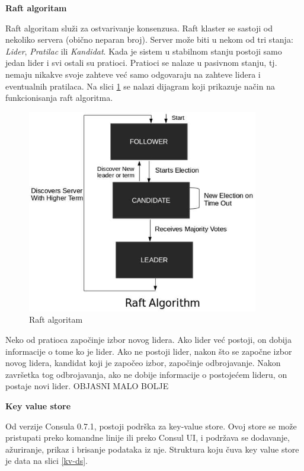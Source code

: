 \documentclass[a4paper,12pt]{report}
\begin{document}
\textbf{Raft algoritam}\newline

Raft algoritam služi za ostvarivanje konsenzusa. Raft klaster se sastoji od  nekoliko servera (obično neparan broj). Server može biti u nekom od tri stanja: \textit{Lider}, \textit{Pratilac} ili \textit{Kandidat}. Kada je sistem u stabilnom stanju postoji samo jedan lider i svi ostali su pratioci. Pratioci se nalaze u pasivnom stanju, tj. nemaju nikakve svoje zahteve već samo odgovaraju na zahteve lidera i eventualnih pratilaca. Na slici \ref{fig:raft-algorithms} se nalazi dijagram koji prikazuje način na funkcionisanja raft algoritma. \newline 

\begin{figure}[h]
    \centering
    \includegraphics[width=0.9\textwidth]{raft_algorithms.jpg}
    \caption{Raft algoritam}
    \label{fig:raft-algorithms}
\end{figure} 

Neko od pratioca započinje izbor novog lidera. Ako lider već postoji, on dobija informacije o tome ko je lider. Ako ne postoji lider, nakon što se započne izbor novog lidera, kandidat koji je započeo izbor, započinje odbrojavanje. Nakon završetka tog odbrojavanja, ako ne dobije informacije o postojećem lideru, on postaje novi lider. OBJASNI MALO BOLJE \newline

\textbf{Key value store}\newline

Od verzije Consula 0.7.1, postoji podrška za key-value store. Ovoj store se može pristupati preko komandne linije ili preko Consul UI, i podržava se dodavanje, ažuriranje, prikaz i brisanje podataka iz nje. Struktura koju čuva key value store je data na slici \ref{kv-ds}. \newline
\end{document}
